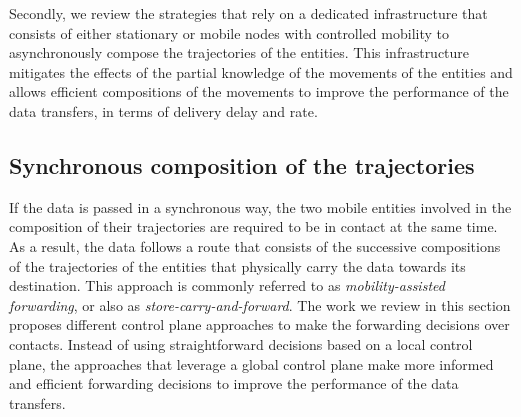 Secondly, we review the strategies that rely on a dedicated infrastructure that consists of either stationary or mobile nodes with controlled mobility to asynchronously compose the trajectories of the entities. This infrastructure mitigates the effects of the partial knowledge of the movements of the entities and allows efficient compositions of the movements to improve the performance of the data transfers, in terms of delivery delay and rate. 


\subsection{Synchronous composition of the trajectories}
\label{sec:indirect-sync}

If the data is passed in a synchronous way, the two mobile entities involved in the composition of their trajectories are required to be in contact at the same time. As a result, the data follows a route that consists of the successive compositions of the trajectories of the entities that physically carry the data towards its destination. This approach is commonly referred to as \textit{mobility-assisted forwarding}, or also as \textit{store-carry-and-forward}. The work we review in this section proposes different control plane approaches to make the forwarding decisions over contacts. Instead of using straightforward decisions based on a local control plane, the approaches that leverage a global control plane make more informed and efficient forwarding decisions to improve the performance of the data transfers. 

